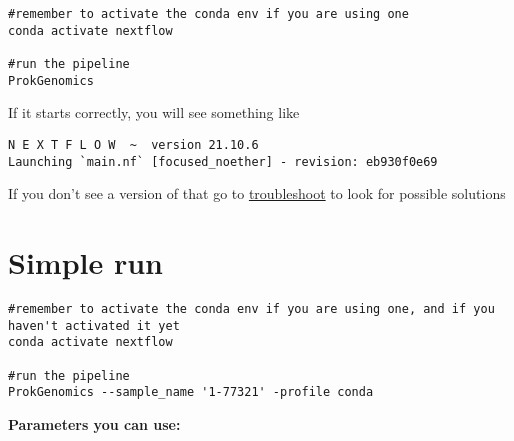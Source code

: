 \documentclass[
]{book}
\begin{document}
\begin{verbatim}
#remember to activate the conda env if you are using one
conda activate nextflow

#run the pipeline
ProkGenomics
\end{verbatim}

If it starts correctly, you will see something like

\begin{verbatim}
N E X T F L O W  ~  version 21.10.6
Launching `main.nf` [focused_noether] - revision: eb930f0e69
\end{verbatim}

If you don't see a version of that go to \href{troubleshooting.html}{troubleshoot} to look for possible solutions

\hypertarget{simple-run}{%
\section{Simple run}\label{simple-run}}

\begin{verbatim}
#remember to activate the conda env if you are using one, and if you haven't activated it yet
conda activate nextflow

#run the pipeline
ProkGenomics --sample_name '1-77321' -profile conda
\end{verbatim}

\textbf{Parameters you can use:}
\end{document}
